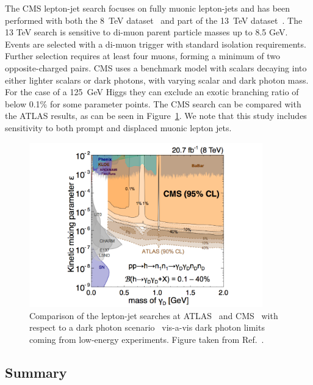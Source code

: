 The CMS lepton-jet search focuses on fully muonic lepton-jets and has been performed with both the 8~TeV dataset~\cite{Khachatryan:2015wka} and part of the 13~TeV dataset~\cite{Sirunyan:2018mgs}. The 13 TeV search is sensitive to di-muon parent particle masses up to 8.5 GeV. Events are selected with a di-muon trigger with standard isolation requirements. Further selection requires at least four muons, forming a minimum of two opposite-charged pairs. CMS uses a benchmark model with scalars decaying into either lighter scalars or dark photons, with varying scalar and dark photon mass. For the case of a 125~GeV Higgs they can exclude an exotic branching ratio of below 0.1\% for some parameter points. The CMS search can be compared with the ATLAS results, as can be seen in Figure~\ref{fig:dark_photons_CMS_ATLAS}. We note that this study includes sensitivity to both prompt and displaced muonic lepton jets.

\begin{figure}[htb]
\centering
\includegraphics[width=0.9\textwidth]{plots/Limit_Eps_mass_v6.pdf}
\caption{Comparison of the lepton-jet searches at ATLAS~\cite{Aad:2014yea} and CMS~\cite{Sirunyan:2018mgs} with respect to a dark photon scenario~\cite{Falkowski:2010cm} vis-a-vis dark photon limits coming from low-energy experiments. Figure taken from Ref.~\cite{Sirunyan:2018mgs}.}
\label{fig:dark_photons_CMS_ATLAS}
\end{figure}

\subsection{Summary}
\label{sec:leptonicsummary}

